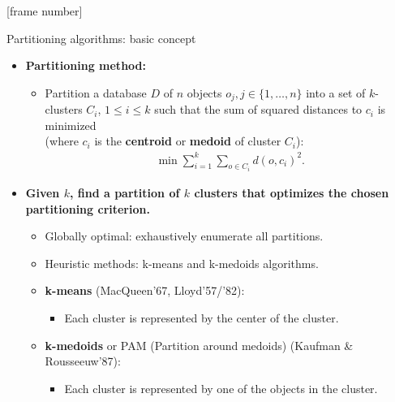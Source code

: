 \documentclass[aspectratio=169,t,xcolor=dvipsnames]{beamer}
\begin{document}
  {
    [frame number]
    \begin{frame}{Partitioning algorithms: basic concept}
        \begin{itemize}
          \item \textbf{Partitioning method:}
          \begin{itemize}
            \item Partition a database $D$ of $n$ objects $o_j, j \in \{1, \ldots, n\}$ into a set of $k$-clusters $C_i$, $1 \leq i \leq k$ such that the sum of squared distances to $c_i$ is minimized \\ (where $c_i$ is the \textbf{\color{airforceblue}centroid} or \textbf{\color{airforceblue}medoid} of cluster $C_i$):
            \begin{align}
              \min \sum_{i=1}^{k} \sum_{o \in C_i} d(o,c_i)^2.
            \end{align}
          \end{itemize}
          \item \textbf{Given $k$, find a partition of $k$ clusters that optimizes the chosen partitioning criterion.}
          \begin{itemize}
            \item Globally optimal: exhaustively enumerate all partitions.
            \item Heuristic methods: k-means and k-medoids algorithms.
            \item \textbf{\color{airforceblue}k-means} (MacQueen'67, Lloyd'57/'82):
            \begin{itemize}
              \item Each cluster is represented by the center of the cluster.
            \end{itemize}
            \item \textbf{\color{airforceblue}k-medoids} or PAM (Partition around medoids) (Kaufman \& Rousseeuw'87):
            \begin{itemize}
              \item Each cluster is represented by one of the objects in the cluster.
            \end{itemize}
          \end{itemize}
        \end{itemize}
    \end{frame}
  }
\end{document}
